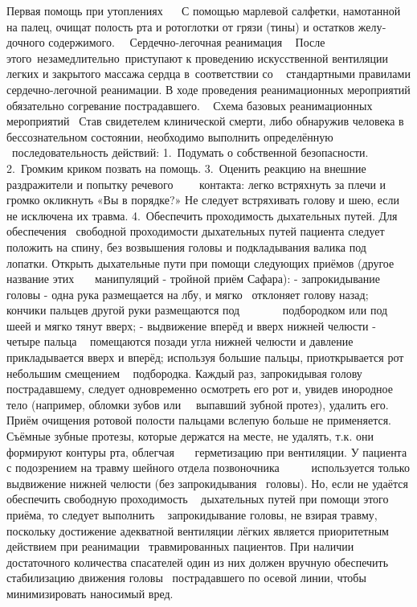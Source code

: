 \documentclass[a4paper, 12pt]{article}
\theoremstyle{definition}
\begin{document}
        Первая помощь при утоплениях
           С помощью марлевой салфетки, намотанной на палец, очищат полость рта и ротоглотки от грязи (тины) и остатков желу­дочного содержимого.
          Сердечно-ле­гочная реанимация
         
        После этого незамедлитель­но приступают к проведению искусственной венти­ляции легких и закрытого массажа сердца в соот­ветствии со   стандартными правилами сердечно-ле­гочной реанимации.
        В ходе проведения реанимационных мероприятий обязательно согревание пострадавшего.
         
        Схема базовых реанимационных мероприятий
         Став свидетелем клинической смерти, либо обнаружив человека в бессознательном состоянии, необходимо выполнить определённую  последовательность действий:
        1. Подумать о собственной безопасности.
        2. Громким криком позвать на помощь.
        3. Оценить реакцию на внешние раздражители и попытку речевого     контакта: легко встряхнуть за плечи и громко окликнуть «Вы в порядке?» Не следует встряхивать голову и шею, если не исключена их травма.
        4. Обеспечить проходимость дыхательных путей. Для обеспечения  свободной проходимости дыхательных путей пациента следует положить на спину, без возвышения головы и подкладывания валика под лопатки. Открыть дыхательные пути при помощи следующих приёмов (другое название этих    манипуляций - тройной приём Сафара):
        - запрокидывание головы - одна рука размещается на лбу, и мягко  отклоняет голову назад; кончики пальцев другой руки размещаются под        подбородком или под шеей и мягко тянут вверх;
        - выдвижение вперёд и вверх нижней челюсти - четыре пальца   помещаются позади угла нижней челюсти и давление прикладывается вверх и вперёд; используя большие пальцы, приоткрывается рот небольшим смещением   подбородка.
        Каждый раз, запрокидывая голову пострадавшему, следует одновременно осмотреть его рот и, увидев инородное тело (например, обломки зубов или   выпавший зубной протез), удалить его. Приём очищения ротовой полости пальцами вслепую больше не применяется. Съёмные зубные протезы, которые держатся на месте, не удалять, т.к. они формируют контуры рта, облегчая    герметизацию при вентиляции.
        У пациента с подозрением на травму шейного отдела позвоночника      используется только выдвижение нижней челюсти (без запрокидывания  головы). Но, если не удаётся обеспечить свободную проходимость   дыхательных путей при помощи этого приёма, то следует выполнить   запрокидывание головы, не взирая травму, поскольку достижение адекватной вентиляции лёгких является приоритетным действием при реанимации  травмированных пациентов. При наличии достаточного количества спасателей один из них должен вручную обеспечить стабилизацию движения головы  пострадавшего по осевой линии, чтобы минимизировать наносимый вред.
\end{document}
